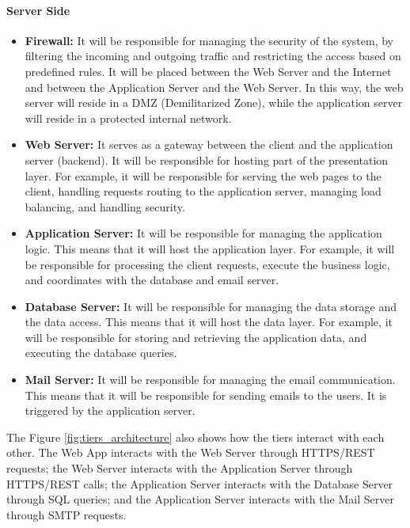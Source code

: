 \paragraph{Server Side}
\begin{itemize}
    \item \textbf{Firewall:} It will be responsible for managing the security of the system, by filtering the incoming and outgoing traffic and restricting
    the access based on predefined rules. It will be placed between the Web Server and the Internet and between the Application Server and the Web Server.
    In this way, the web server will reside in a DMZ (Demilitarized Zone), while the application server will reside in a protected internal network.
    \item \textbf{Web Server:} It serves as a gateway between the client and the application server (backend). It will be responsible for hosting part 
    of the presentation layer. For example, it will be responsible for serving the web pages to the client, handling requests routing to the application
    server, managing load balancing, and handling security.
    \item \textbf{Application Server:} It will be responsible for managing the application logic. This means that it will host the application layer. For 
    example, it will be responsible for processing the client requests, execute the business logic, and coordinates with the database and email server.
    \item \textbf{Database Server:} It will be responsible for managing the data storage and the data access. This means that it will host the data layer.
    For example, it will be responsible for storing and retrieving the application data, and executing the database queries.
    \item \textbf{Mail Server:} It will be responsible for managing the email communication. This means that it will be responsible for sending emails to 
    the users. It is triggered by the application server.
\end{itemize}

The Figure \ref{fig:tiers_architecture} also shows how the tiers interact with each other. The Web App interacts with the Web Server through HTTPS/REST 
requests; the Web Server interacts with the Application Server through HTTPS/REST calls; the Application Server interacts with the Database Server through 
SQL queries; and the Application Server interacts with the Mail Server through SMTP requests.



